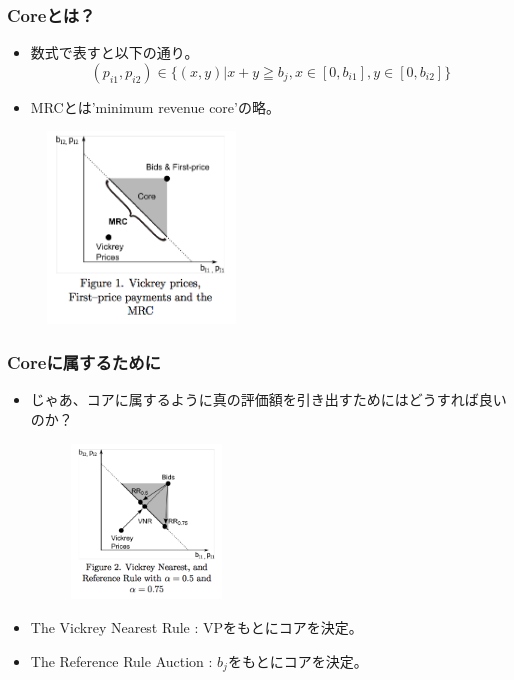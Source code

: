\documentclass[dvipdfmx,12pt]{beamer}
\begin{document}
\begin{frame}
\frametitle{Coreとは？}
\begin{itemize}\setlength{\parskip}{0.5em}
\item
数式で表すと以下の通り。
\begin{equation}
  (p_{i1}, p_{i2}) \in \{ (x, y) | x + y  \geqq b_{j}, x \in [0, b_{i1}], y \in [0, b_{i2}]\}
\end{equation}
\pause
\item
MRCとは'minimum revenue core'の略。
\end{itemize}
\begin{figure}
\centering
\includegraphics[width=50mm]{core1.png}
\label{fig:core2}
\end{figure}
\end{frame}


\begin{frame}
\frametitle{Coreに属するために}
\begin{itemize}\setlength{\parskip}{0.5em}
\item
じゃあ、コアに属するように真の評価額を引き出すためにはどうすれば良いのか？\pause
\begin{figure}
\centering
\includegraphics[width=40mm]{core2.png}
\label{fig:core}
\end{figure}
\item
The Vickrey Nearest Rule : VPをもとにコアを決定。
\item
The Reference Rule Auction : $b_{j}$をもとにコアを決定。
\end{itemize}
\end{frame}
\end{document}

